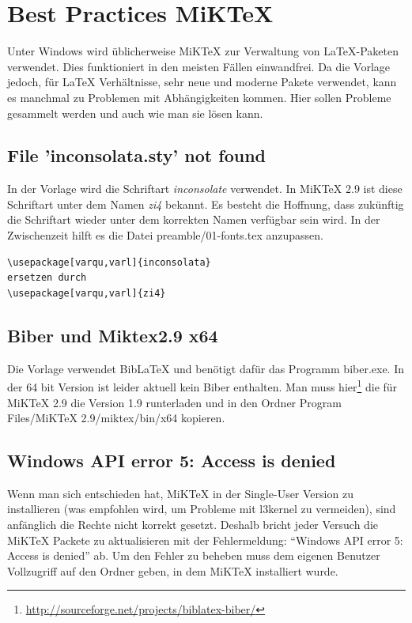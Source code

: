 \section{Best Practices MiKTeX}

Unter Windows wird üblicherweise MiKTeX zur Verwaltung von LaTeX-Paketen verwendet. 
Dies funktioniert in den meisten Fällen einwandfrei.
Da die Vorlage jedoch, für LaTeX Verhältnisse, sehr neue und moderne Pakete verwendet, kann es manchmal zu Problemen mit Abhängigkeiten kommen.
Hier sollen Probleme gesammelt werden und auch wie man sie lösen kann.

\subsection{File 'inconsolata.sty' not found}
In der Vorlage wird die Schriftart \emph{inconsolate} verwendet. In MiKTeX 2.9 ist diese Schriftart unter dem Namen \emph{zi4} bekannt.
Es besteht die Hoffnung, dass zukünftig die Schriftart wieder unter dem korrekten Namen verfügbar sein wird.
In der Zwischenzeit hilft es die Datei preamble/01-fonts.tex anzupassen.
\begin{verbatim}
\usepackage[varqu,varl]{inconsolata}
ersetzen durch
\usepackage[varqu,varl]{zi4}
\end{verbatim}

\subsection{Biber und Miktex2.9 x64}
Die Vorlage verwendet BibLaTeX und benötigt dafür das Programm biber.exe.
In der 64 bit Version ist leider aktuell kein Biber enthalten.
Man muss hier\footnote{\url{http://sourceforge.net/projects/biblatex-biber/}}  die für MiKTeX 2.9 die Version 1.9 runterladen und in den Ordner Program Files/MiKTeX 2.9/miktex/bin/x64 kopieren.

\subsection{Windows API error 5: Access is denied}
Wenn man sich entschieden hat, MiKTeX in der Single-User Version zu installieren (was empfohlen wird, um Probleme mit l3kernel zu vermeiden), sind anfänglich die Rechte nicht korrekt gesetzt. 
Deshalb bricht jeder Versuch die MiKTeX Packete zu aktualisieren mit der Fehlermeldung: "`Windows API error 5: Access is denied"' ab.
Um den Fehler zu beheben muss dem eigenen Benutzer Vollzugriff auf den Ordner geben, in dem MiKTeX installiert wurde.

